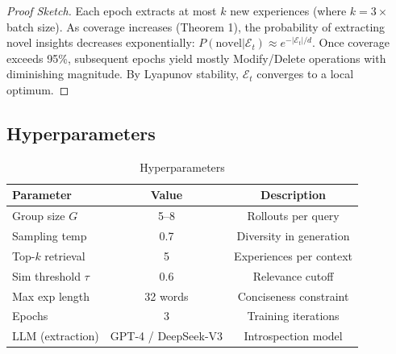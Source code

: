 \begin{proof}[Proof Sketch]
Each epoch extracts at most $k$ new experiences (where $k = 3 \times$ batch size). As coverage increases (Theorem 1), the probability of extracting novel insights decreases exponentially: $P(\text{novel} | \mathcal{E}_t) \approx e^{-|\mathcal{E}_t|/d}$. Once coverage exceeds 95\%, subsequent epochs yield mostly Modify/Delete operations with diminishing magnitude. By Lyapunov stability, $\mathcal{E}_t$ converges to a local optimum.
\end{proof}

\subsection{Hyperparameters}

\begin{table}[t]
\centering
\caption{\DSO{} Hyperparameters}
\label{tab:hyperparams}
\begin{tabular}{lcc}
\toprule
\textbf{Parameter} & \textbf{Value} & \textbf{Description} \\
\midrule
Group size $G$ & 5--8 & Rollouts per query \\
Sampling temp & 0.7 & Diversity in generation \\
Top-$k$ retrieval & 5 & Experiences per context \\
Sim threshold $\tau$ & 0.6 & Relevance cutoff \\
Max exp length & 32 words & Conciseness constraint \\
Epochs & 3 & Training iterations \\
LLM (extraction) & GPT-4 / DeepSeek-V3 & Introspection model \\
\bottomrule
\end{tabular}
\end{table}

